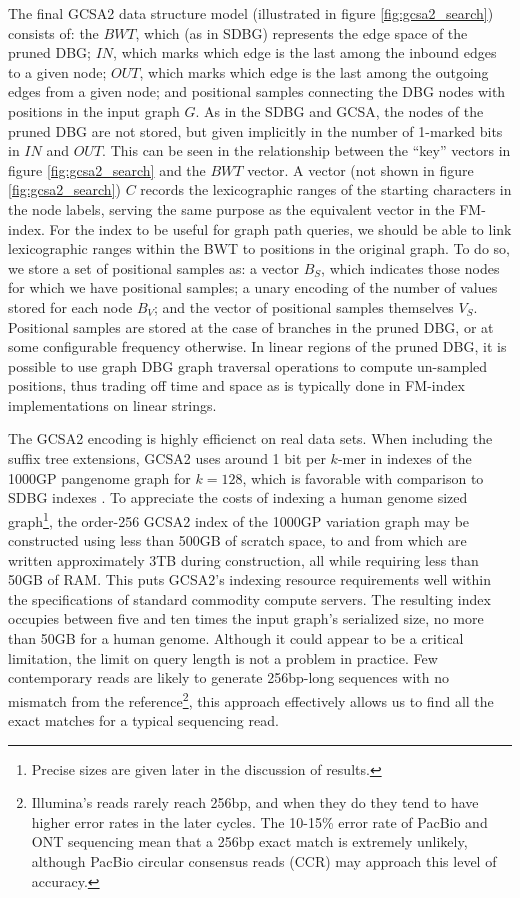 The final GCSA2 data structure model (illustrated in figure \ref{fig:gcsa2_search}) consists of: the $BWT$, which (as in SDBG) represents the edge space of the pruned DBG; $IN$, which marks which edge is the last among the inbound edges to a given node; $OUT$, which marks which edge is the last among the outgoing edges from a given node; and positional samples connecting the DBG nodes with positions in the input graph $G$.
As in the SDBG and GCSA, the nodes of the pruned DBG are not stored, but given implicitly in the number of 1-marked bits in $IN$ and $OUT$.
This can be seen in the relationship between the ``key'' vectors in figure \ref{fig:gcsa2_search} and the $BWT$ vector.
A vector (not shown in figure \ref{fig:gcsa2_search}) $C$ records the lexicographic ranges of the starting characters in the node labels, serving the same purpose as the equivalent vector in the FM-index.
For the index to be useful for graph path queries, we should be able to link lexicographic ranges within the BWT to positions in the original graph.
To do so, we store a set of positional samples as: a vector $B_S$, which indicates those nodes for which we have positional samples; a unary encoding of the number of values stored for each node $B_V$; and the vector of positional samples themselves $V_S$.
Positional samples are stored at the case of branches in the pruned DBG, or at some configurable frequency otherwise.
In linear regions of the pruned DBG, it is possible to use graph DBG graph traversal operations to compute un-sampled positions, thus trading off time and space as is typically done in FM-index implementations on linear strings.

The GCSA2 encoding is highly efficienct on real data sets.
When including the suffix tree extensions, GCSA2 uses around 1 bit per $k$-mer in indexes of the 1000GP pangenome graph for $k=128$, which is favorable with comparison to SDBG indexes \cite{siren2017indexing}.
To appreciate the costs of indexing a human genome sized graph\footnote{Precise sizes are given later in the discussion of results.}, the order-256 GCSA2 index of the 1000GP variation graph may be constructed using less than 500GB of scratch space, to and from which are written approximately 3TB during construction, all while requiring less than 50GB of RAM.
This puts GCSA2's indexing resource requirements well within the specifications of standard commodity compute servers.
The resulting index occupies between five and ten times the input graph's serialized size, no more than 50GB for a human genome.
Although it could appear to be a critical limitation, the limit on query length is not a problem in practice.
Few contemporary reads are likely to generate 256bp-long sequences with no mismatch from the reference\footnote{Illumina's reads rarely reach 256bp, and when they do they tend to have higher error rates in the later cycles. The 10-15\% error rate of PacBio and ONT sequencing mean that a 256bp exact match is extremely unlikely, although PacBio circular consensus reads (CCR) may approach this level of accuracy.}, this approach effectively allows us to find all the exact matches for a typical sequencing read.




